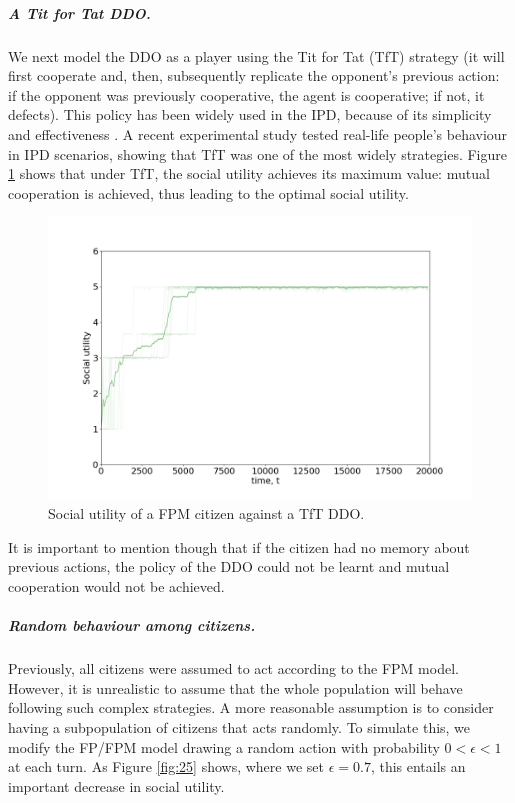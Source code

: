 \subparagraph{A Tit for Tat DDO.}
We next model the DDO as a player using the Tit for Tat (TfT) strategy
(it will first cooperate and, then, subsequently replicate the opponent's previous action: if the opponent was previously cooperative, the agent is cooperative; if not, it defects).
This policy has been widely used in the IPD, because of its simplicity and effectiveness \parencite{axelrod84}. A recent experimental study 
\parencite{dal2019strategy}
 tested real-life people's behaviour in IPD scenarios,
 showing that TfT was one of the most widely strategies.
 Figure \ref{fig:FPMvsTfT} shows that under TfT, the 
 social utility achieves its maximum value: mutual cooperation is achieved, thus leading to the optimal social utility.

\begin{figure}[h!]
\centering
\includegraphics[width=0.6\linewidth]{img/tft.png}%
\caption{Social utility of a FPM citizen against a TfT DDO.}\label{fig:FPMvsTfT}
\end{figure}

\noindent It is important to mention though that 
if the citizen had no memory about previous actions, the policy of the DDO could not be learnt and mutual cooperation would not be achieved.

\subparagraph{Random behaviour among citizens.}
 Previously,  all citizens were assumed to
 act according to the FPM model.
 However, 
 it is unrealistic to assume
 that the whole population will behave following such complex strategies. A more reasonable
 assumption is to consider having a  subpopulation of citizens that acts randomly. To simulate this, we modify the FP/FPM model drawing a random action with probability $0 < \epsilon < 1$ at each turn. As Figure \ref{fig:25} shows, where we set $\epsilon = 0.7$, this entails an important decrease in social utility. 


